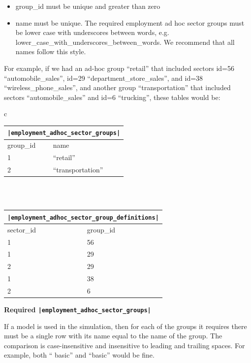 \begin{itemize}
\tight
\item group_id must be unique and greater than zero
\item name must be unique. The required employment ad hoc sector groups must be
lower case with underscores between words, e.g.
lower_case_with_underscores_between_words. We recommend that all names follow
this style.
\end{itemize}

For example, if we had an ad-hoc group ``retail'' that included sectors id=56
``automobile_sales'', id=29 ``department_store_sales'', and id=38
``wireless_phone_sales'', and another group ``transportation'' that included
sectors ``automobile_sales'' and id=6 ``trucking'', these tables would be:

\begin{center}
\begin{tabular}{c}

\begin{tabular}{|l|l|}
\multicolumn{2}{c}{\tt|employment_adhoc_sector_groups|}\\
\hline
group_id & name \\
\hline
1 &``retail'' \\
\hline
2 &``transportation'' \\
\hline
\end{tabular}

\\ \\

\begin{tabular}{|l|l|}
\multicolumn{2}{c}{\tt|employment_adhoc_sector_group_definitions|}\\
\hline
sector_id & group_id \\
\hline
1 &56 \\
\hline
1 &29 \\
\hline
2 &29 \\
\hline
1 &38 \\
\hline
2 &6 \\
\hline
\end{tabular}

\end{tabular}
\end{center}
\textbf{Required \tt|employment_adhoc_sector_groups|}

If a model is used in the simulation, then for each of the groups it requires
there must be a single row with its name equal to the name of the group. The
comparison is case-insensitive and insensitive to leading and trailing spaces.
For example, both `` basic'' and ``basic'' would be fine.

